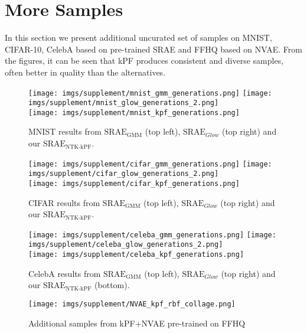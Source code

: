 
\newpage
\section{More Samples}

In this section we present additional uncurated set of samples on MNIST, CIFAR-10, CelebA based on pre-trained SRAE and FFHQ based on NVAE. From the figures, it can be seen that kPF produces consistent and diverse samples, often better in quality than the alternatives.
\vfill
\begin{figure}[h]
    \centering
    \texttt{[image: imgs/supplement/mnist\_gmm\_generations.png]}
    \texttt{[image: imgs/supplement/mnist\_glow\_generations\_2.png]}\\
    \texttt{[image: imgs/supplement/mnist\_kpf\_generations.png]}\\
    \caption{MNIST results from $\textrm{SRAE}_\textrm{GMM}$ (top left), $\textrm{SRAE}_{Glow}$ (top right) and our $\textrm{SRAE}_\textrm{NTK-kPF}$.}
    \label{fig:mnist-more-samples}
\end{figure}
\vfill

\newpage
\vfill
\begin{figure}
    \centering
    \texttt{[image: imgs/supplement/cifar\_gmm\_generations.png]}
    \texttt{[image: imgs/supplement/cifar\_glow\_generations\_2.png]}\\
    \texttt{[image: imgs/supplement/cifar\_kpf\_generations.png]}\\
    \caption{CIFAR results from $\textrm{SRAE}_\textrm{GMM}$ (top left), $\textrm{SRAE}_{Glow}$ (top right) and our $\textrm{SRAE}_\textrm{NTK-kPF}$.}
    \label{fig:cifar-more-samples}
\end{figure}
\vfill

\newpage
\vfill
\begin{figure}
    \centering
    \texttt{[image: imgs/supplement/celeba\_gmm\_generations.png]}
    \texttt{[image: imgs/supplement/celeba\_glow\_generations\_2.png]}\\
    \texttt{[image: imgs/supplement/celeba\_kpf\_generations.png]}\\
    \caption{CelebA results from $\textrm{SRAE}_\textrm{GMM}$ (top left), $\textrm{SRAE}_{Glow}$ (top right) and our $\textrm{SRAE}_\textrm{NTK-kPF}$ (bottom).}
    \label{fig:celeba-more-samples}
\end{figure}
\vfill

\begin{figure}
    \centering
    \texttt{[image: imgs/supplement/NVAE\_kpf\_rbf\_collage.png]}
    \caption{Additional samples from kPF+NVAE pre-trained on FFHQ}
    \label{fig:nvae-more-samples}
\end{figure}

\clearpage
